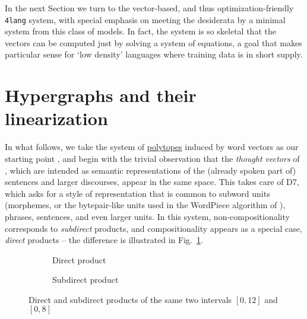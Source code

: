 \documentclass[output=paper,colorlinks=true,citecolor=brown]{langscibook}
\begin{document}
In the next Section we turn to the vector-based, and thus
optimization-friendly \texttt{4lang} system, with special emphasis on meeting
the desiderata by a minimal system from this class of models. In fact, the
system is so skeletal that the vectors can be computed just by solving a
system of equations, a goal that makes particular sense for `low density'
languages where training data is in short supply.

\section{Hypergraphs and their linearization}\label{4lang}

In what follows, we take the system of
\href{https://en.wikipedia.org/wiki/Polytope}{polytopes} induced by word
vectors as our starting point \citep{Kornai:2022}, and begin with the trivial
observation that the {\it thought vectors} of \citet{LeCun:2015}, which are
intended as semantic representations of the (already spoken part of) sentences
and larger discourses, appear in the same space. This takes care of D7, which
asks for a style of representation that is common to subword units (morphemes,
or the bytepair-like units used in the WordPiece algorithm of \cite{Wu:2016}),
phrases, sentences, and even larger units. In this system,
non-compositionality corresponds to {\it subdirect} products, and
compositionality appears as a special case, {\it direct} products
\citep{Kornai:2010} -- the difference is illustrated in
Fig.~\ref{fig:dirsubdir}.


\begin{figure}[h]
    \centering
    \begin{subfigure}[t]{0.5\textwidth}
	\centering
        \caption{Direct product}
    \end{subfigure}%
    \begin{subfigure}[t]{0.5\textwidth}
        \centering
                \caption{Subdirect product}
    \end{subfigure}
    \caption{Direct and subdirect products of the same two intervals $[0,12]$ and $[0,8]$}\label{fig:dirsubdir}
\end{figure}
\end{document}
